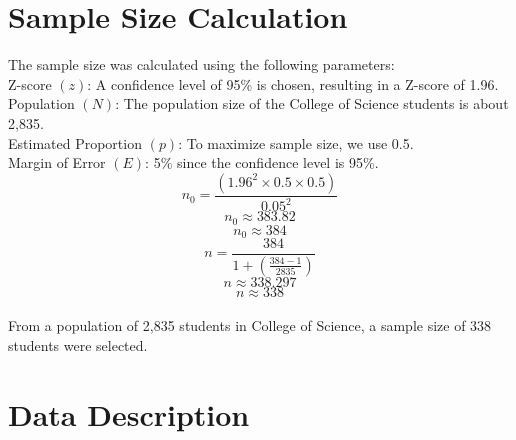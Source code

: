 \documentclass[doublespacing,12pt]{report}
\begin{document}
\section{Sample Size Calculation}
The sample size was calculated using the following parameters:
\vspace{0.3in}
\\
\vspace{0.1in}
{Z-score} \((z)\): A confidence level of 95\% is chosen, resulting in a Z-score of 1.96.\\
\vspace{0.1in}
{Population} \((N)\): The population size of the College of Science students is about 2,835.\\
\vspace{0.1in}
{Estimated Proportion} \((p)\): To maximize sample size, we use 0.5.\\
\vspace{0.1in}
{Margin of Error} \((E)\): 5\% since the confidence level is 95\%.\\


\begin{equation}
n_0 = \frac{\left(1.96^2 \times 0.5 \times 0.5\right)}{0.05^2}
\end{equation}
\begin{equation}
n_0 \approx 383.82
\end{equation}
\begin{equation}
n_0 \approx 384
\end{equation}
\begin{equation}
n = \frac{384}{1 + \left(\frac{384 - 1}{2835}\right)}
\end{equation}
\begin{equation}
n \approx 338.297
\end{equation}
\begin{equation}
n \approx 338
\end{equation}\\

\noindent From a population of 2,835 students in College of Science, a sample size of 338 students were selected.

\section{Data Description}
\end{document}
